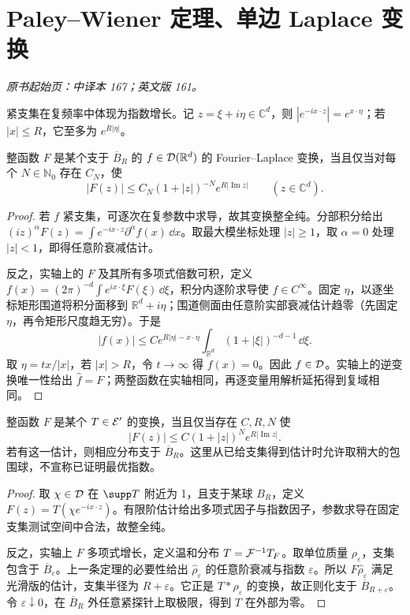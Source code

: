 \section{Paley--Wiener 定理、单边 Laplace 变换}\label{sec:yosida-06-04}
\noindent\textit{原书起始页：中译本 167；英文版 161。}

紧支集在复频率中体现为指数增长。记 $z=\xi+i\eta\in\mathbb C^d$，则 $|e^{-ix\cdot z}|=e^{x\cdot\eta}$；若 $|x|\le R$，它至多为 $e^{R|\eta|}$。

\begin{theorem}\label{thm:y6-pw-smooth}
整函数 $F$ 是某个支于 $\overline B_R$ 的 $f\in\mathcal{D}(\mathbb R^d)$ 的 Fourier--Laplace 变换，当且仅当对每个 $N\in\mathbb N_0$ 存在 $C_N$，使
\[
 |F(z)|\le C_N(1+|z|)^{-N}e^{R|\operatorname{Im}z|}\qquad(z\in\mathbb C^d).
\]
\end{theorem}
\begin{proof}
若 $f$ 紧支集，可逐次在复参数中求导，故其变换整全纯。分部积分给出 $(iz)^\alpha F(z)=\int e^{-ix\cdot z}\partial^\alpha f(x)\,\dd x$。取最大模坐标处理 $|z|\ge1$，取 $\alpha=0$ 处理 $|z|<1$，即得任意阶衰减估计。

反之，实轴上的 $F$ 及其所有多项式倍数可积，定义
$f(x)=(2\pi)^{-d}\int e^{ix\cdot\xi}F(\xi)\,\dd\xi$，积分内逐阶求导使 $f\in C^\infty$。固定 $\eta$，以逐坐标矩形围道将积分面移到 $\mathbb R^d+i\eta$；围道侧面由任意阶实部衰减估计趋零（先固定 $\eta$，再令矩形尺度趋无穷）。于是
\[
 |f(x)|\le C e^{R|\eta|-x\cdot\eta}
 \int_{\mathbb R^d}(1+|\xi|)^{-d-1}\,\dd\xi.
\]
取 $\eta=t x/|x|$，若 $|x|>R$，令 $t\to\infty$ 得 $f(x)=0$。因此 $f\in\mathcal{D}$。实轴上的逆变换唯一性给出 $\widehat f=F$；两整函数在实轴相同，再逐变量用解析延拓得到复域相同。
\end{proof}

\begin{theorem}[紧支集分布的整函数刻画]\label{thm:y6-pw-distribution}
整函数 $F$ 是某个 $T\in\mathcal{E}'$ 的变换，当且仅当存在 $C,R,N$ 使
\[
 |F(z)|\le C(1+|z|)^N e^{R|\operatorname{Im}z|}.
\]
若有这一估计，则相应分布支于 $\overline B_R$。这里从已给支集得到估计时允许取稍大的包围球，不宣称已证明最优指数。
\end{theorem}
\begin{proof}
取 $\chi\in\mathcal{D}$ 在 $\supp T$ 附近为 1，且支于某球 $B_R$，定义 $F(z)=T(\chi e^{-ix\cdot z})$。有限阶估计给出多项式因子与指数因子，参数求导在固定支集测试空间中合法，故整全纯。

反之，实轴上 $F$ 多项式增长，定义温和分布 $T=\mathcal{F}^{-1}T_F$。取单位质量 $\rho_\varepsilon$，支集包含于 $\overline B_\varepsilon$。上一条定理的必要性给出 $\widehat\rho_\varepsilon$ 的任意阶衰减与指数 $\varepsilon$。所以 $F\widehat\rho_\varepsilon$ 满足光滑版的估计，支集半径为 $R+\varepsilon$。它正是 $T*\rho_\varepsilon$ 的变换，故正则化支于 $\overline B_{R+\varepsilon}$。令 $\varepsilon\downarrow0$，在 $\overline B_R$ 外任意紧探针上取极限，得到 $T$ 在外部为零。
\end{proof}


